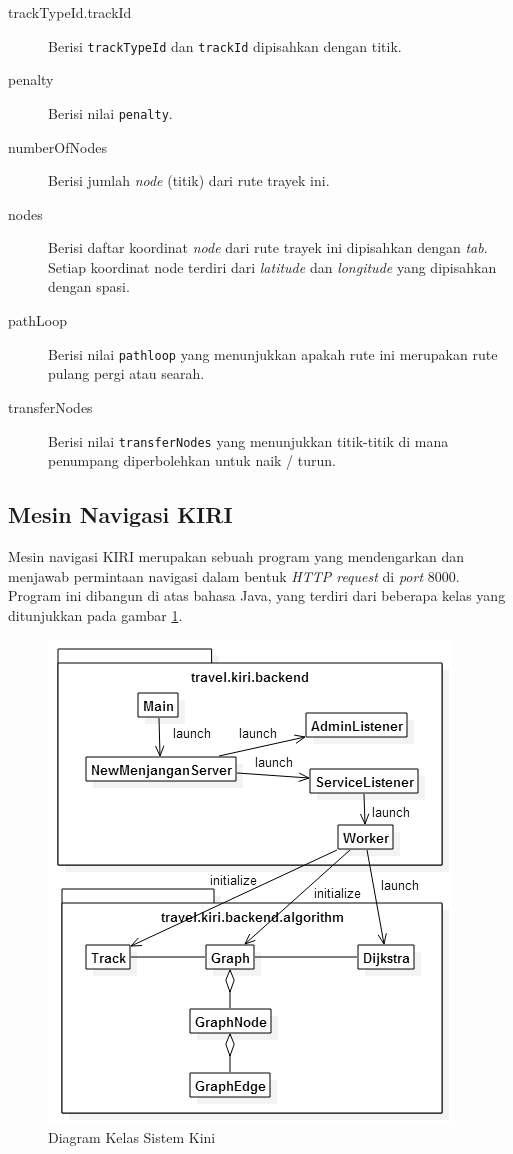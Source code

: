\begin{description}
	\item[trackTypeId.trackId] Berisi \texttt{trackTypeId} dan \texttt{trackId} dipisahkan dengan titik.
	\item[penalty] Berisi nilai \texttt{penalty}.
	\item[numberOfNodes] Berisi jumlah \textit{node} (titik) dari rute trayek ini.
	\item[nodes] Berisi daftar koordinat \textit{node} dari rute trayek ini dipisahkan dengan \textit{tab}. Setiap koordinat node terdiri dari \textit{latitude} dan \textit{longitude} yang dipisahkan dengan spasi.
	\item[pathLoop] Berisi nilai \texttt{pathloop} yang menunjukkan apakah rute ini merupakan rute pulang pergi atau searah.
	\item[transferNodes] Berisi nilai \texttt{transferNodes} yang menunjukkan titik-titik di mana penumpang diperbolehkan untuk naik / turun.
\end{description}

\subsection{Mesin Navigasi KIRI}

Mesin navigasi KIRI merupakan sebuah program yang mendengarkan dan menjawab permintaan navigasi dalam bentuk \textit{HTTP request} di \textit{port} 8000. Program ini dibangun di atas bahasa Java, yang terdiri dari beberapa kelas yang ditunjukkan pada gambar \ref{fig:2_diagram_kelas_sistem_kini}.

\begin{figure}
	\centering
	\includegraphics[scale=0.5]{Gambar/2_diagram_kelas_sistem_kini}
	\caption{Diagram Kelas Sistem Kini} 
	\label{fig:2_diagram_kelas_sistem_kini}
\end{figure}

